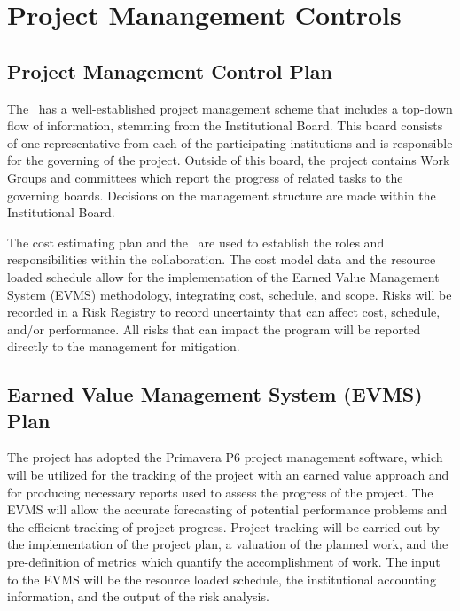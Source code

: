\section{Project Manangement Controls}

\subsection{Project Management Control Plan}

The \GADMC\ has a well-established project management scheme that includes a top-down flow of information, stemming from the Institutional Board. This board consists of one representative from each of the participating institutions and is responsible for the governing of the project.  Outside of this board, the project contains Work Groups and committees which report the progress of related tasks to the governing boards.  Decisions on the management structure are made within the Institutional Board. 

The cost estimating plan and the \WBS\ are used to establish the roles and responsibilities within the collaboration.  The cost model data and the resource loaded schedule allow for the implementation of the Earned Value Management System (EVMS) methodology, integrating cost, schedule, and scope.  Risks will be recorded in a Risk Registry to record uncertainty that can affect cost, schedule, and/or performance.  All risks that can impact the program will be reported directly to the management for mitigation.

\subsection{Earned Value Management System (EVMS) Plan}
The project has adopted the Primavera P6 project management software, which will be utilized for the tracking of the project with an earned value approach and for producing necessary reports used to assess the progress of the project.  The EVMS will allow the accurate forecasting of potential performance problems and the efficient tracking of project progress.  Project tracking will be carried out by the implementation of the project plan, a valuation of the planned work, and the pre-definition of metrics which quantify the accomplishment of work. The input to the EVMS will be the resource loaded schedule, the institutional accounting information, and the output of the risk analysis.
